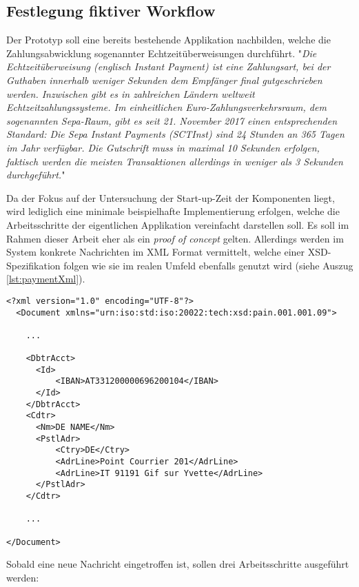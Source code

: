 \subsection{Festlegung fiktiver Workflow \checkmark}
\label{ss:fiktiverWorkflow}

Der Prototyp soll eine bereits bestehende Applikation nachbilden, welche die Zahlungsabwicklung sogenannter Echtzeitüberweisungen durchführt. "\emph{Die Echtzeitüberweisung (englisch Instant Payment) ist eine Zahlungsart, bei der Guthaben innerhalb weniger Sekunden dem Empfänger final gutgeschrieben werden. Inzwischen gibt es in zahlreichen Ländern weltweit Echtzeitzahlungssysteme. Im einheitlichen Euro-Zahlungsverkehrsraum, dem sogenannten Sepa-Raum, gibt es seit 21. November 2017 einen entsprechenden Standard: Die Sepa Instant Payments (SCTInst) sind 24 Stunden an 365 Tagen im Jahr verfügbar. Die Gutschrift muss in maximal 10 Sekunden erfolgen, faktisch werden die meisten Transaktionen allerdings in weniger als 3 Sekunden durchgeführt.}" \cite{instpay-def}

Da der Fokus auf der Untersuchung der Start-up-Zeit der Komponenten liegt, wird lediglich eine minimale beispielhafte Implementierung erfolgen, welche die Arbeitsschritte der eigentlichen Applikation vereinfacht darstellen soll. Es soll im Rahmen dieser Arbeit eher als ein \emph{proof of concept} gelten. Allerdings werden im System konkrete Nachrichten im XML Format vermittelt, welche einer XSD-Spezifikation folgen wie sie im realen Umfeld ebenfalls genutzt wird (siehe Auszug \ref{lst:paymentXml}).

\begin{minipage}{\linewidth}
\begin{lstlisting}[style=xmlStyle,caption={Payment Format},label=lst:paymentXml]
  <?xml version="1.0" encoding="UTF-8"?>
  <Document xmlns="urn:iso:std:iso:20022:tech:xsd:pain.001.001.09">

    ...

    <DbtrAcct>
      <Id>
          <IBAN>AT331200000696200104</IBAN>
      </Id>
    </DbtrAcct>
    <Cdtr>
      <Nm>DE NAME</Nm>
      <PstlAdr>
          <Ctry>DE</Ctry>
          <AdrLine>Point Courrier 201</AdrLine>
          <AdrLine>IT 91191 Gif sur Yvette</AdrLine>
      </PstlAdr>
    </Cdtr>

    ... 

</Document>
\end{lstlisting}
\end{minipage}


Sobald eine neue Nachricht eingetroffen ist, sollen drei Arbeitsschritte ausgeführt werden:

